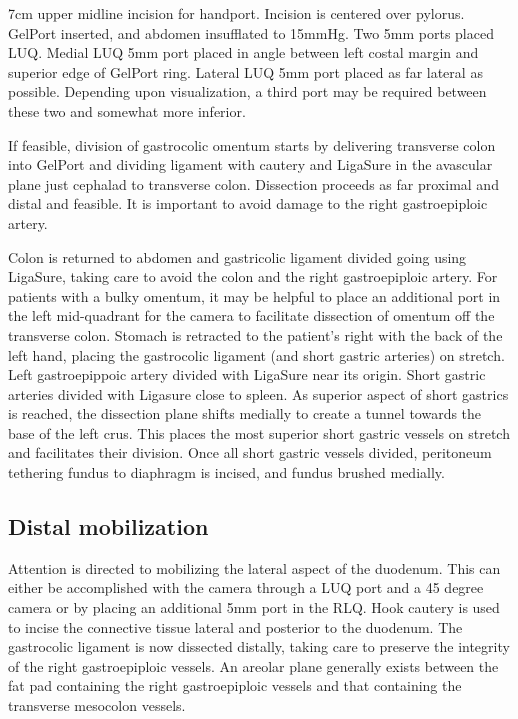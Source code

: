 \documentclass[
  letterpaper,
]{scrbook}
\begin{document}
7cm upper midline incision for handport. Incision is centered over
pylorus. GelPort inserted, and abdomen insufflated to 15mmHg. Two 5mm
ports placed LUQ. Medial LUQ 5mm port placed in angle between left
costal margin and superior edge of GelPort ring. Lateral LUQ 5mm port
placed as far lateral as possible. Depending upon visualization, a third
port may be required between these two and somewhat more inferior.

If feasible, division of gastrocolic omentum starts by delivering
transverse colon into GelPort and dividing ligament with cautery and
LigaSure in the avascular plane just cephalad to transverse colon.
Dissection proceeds as far proximal and distal and feasible. It is
important to avoid damage to the right gastroepiploic artery.

Colon is returned to abdomen and gastricolic ligament divided going
using LigaSure, taking care to avoid the colon and the right
gastroepiploic artery. For patients with a bulky omentum, it may be
helpful to place an additional port in the left mid-quadrant for the
camera to facilitate dissection of omentum off the transverse colon.
Stomach is retracted to the patient's right with the back of the left
hand, placing the gastrocolic ligament (and short gastric arteries) on
stretch. Left gastroepippoic artery divided with LigaSure near its
origin. Short gastric arteries divided with Ligasure close to spleen. As
superior aspect of short gastrics is reached, the dissection plane
shifts medially to create a tunnel towards the base of the left crus.
This places the most superior short gastric vessels on stretch and
facilitates their division. Once all short gastric vessels divided,
peritoneum tethering fundus to diaphragm is incised, and fundus brushed
medially.

\subsection{Distal mobilization}\label{distal-mobilization}

Attention is directed to mobilizing the lateral aspect of the duodenum.
This can either be accomplished with the camera through a LUQ port and a
45 degree camera or by placing an additional 5mm port in the RLQ. Hook
cautery is used to incise the connective tissue lateral and posterior to
the duodenum. The gastrocolic ligament is now dissected distally, taking
care to preserve the integrity of the right gastroepiploic vessels. An
areolar plane generally exists between the fat pad containing the right
gastroepiploic vessels and that containing the transverse mesocolon
vessels.
\end{document}
